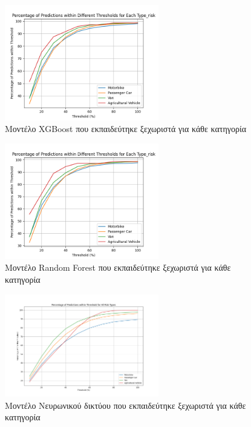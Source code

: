 \documentclass{llncs}
\begin{document}
\begin{figure}
    \begin{center}
        \includegraphics[width=0.6\textwidth]{images/individual_thresholds_xgb.png}
    \end{center}
    \caption{Μοντέλο XGBoost που εκπαιδεύτηκε ξεχωριστά για κάθε κατηγορία}  
    \label{fig:XGBoost_result_cat}  
\end{figure}

\begin{figure}
    \begin{center}
        \includegraphics[width=0.6\textwidth]{images/individual_thresholds_random_forest.png}
    \end{center}
    \caption{Μοντέλο Random Forest που εκπαιδεύτηκε ξεχωριστά για κάθε κατηγορία}  
    \label{fig:random_forest_result_cat}  
\end{figure}

\begin{figure}
    \begin{center}
        \includegraphics[width=0.6\textwidth]{images/individual_thresholds_neural.png}
    \end{center}
    \caption{Μοντέλο Νευρωνικού δικτύου που εκπαιδεύτηκε ξεχωριστά για κάθε κατηγορία}  
    \label{fig:neural_result_cat}  
\end{figure}
\end{document}
